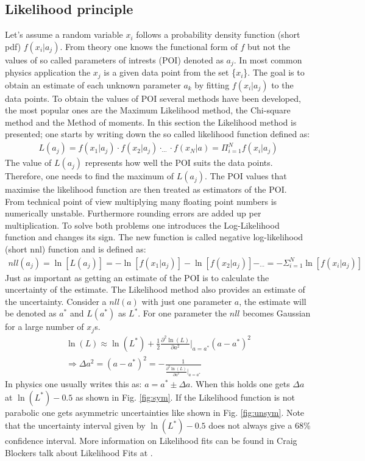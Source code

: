 \documentclass[english]{uzhpub}
\begin{document}
\subsection{Likelihood principle} \label{sec:Likelihood}
Let's assume a random variable $x_i$ follows a probability density function (short pdf) $f(x_i|a_j)$. From theory one knows the functional form of $f$ but not the values of so called parameters of intrests (POI) denoted as $a_j$. In most common physics application the $x_j$ is a given data point from the set \{$x_i$\}. The goal is to obtain an estimate of each unknown parameter $a_k$ by fitting $f(x_i|a_j)$ to the data points.
To obtain the values of POI several methods have been developed, the most popular ones are the Maximum Likelihood method, the Chi-square method and the Method of moments. In this section the Likelihood method is presented; one starts by writing down the so called likelihood function defined as:
\begin{align}
 L(a_j) = f(x_1|a_j) \cdot f(x_2|a_j) \cdot _{\cdots} \cdot f(x_N|a) = \Pi^{N}_{i = 1} f(x_i|a_j)
\end{align}
The value of $L(a_j)$ represents how well the POI suits the data points. Therefore, one needs to find the maximum of $L(a_j)$. The POI values that maximise the likelihood function are then treated as estimators of the POI. \\
From technical point of view multiplying many floating point numbers is numerically unstable. Furthermore rounding errors are added up per multiplication.
To solve both problems one introduces the Log-Likelihood function and changes its sign. The new function is called negative log-likelihood (short nnl) function and is defined as:
\begin{align}
 nll(a_j) = \ln[L(a_j)] = -\ln[f(x_1|a_j)] - \ln[f(x_2|a_j)] - _{\cdots} = - \Sigma^N_{i=1} \ln[f(x_i|a_j)]
\end{align}
Just as important as getting an estimate of the POI is to calculate the uncertainty of the estimate. The Likelihood method also provides an estimate of the uncertainty. Consider a $nll(a)$ with just one parameter $a$, the estimate will be denoted as $a^*$ and $L(a^*)$ as $L^*$. For one parameter the $nll$ becomes Gaussian for a large number of $x_j$s.
\begin{align}
 \ln(L) \approx \ln(L^*) + \frac{1}{2} \frac{\partial^2 \ln(L)}{\partial a^2}|_{a = a^*} \left(a - a^* \right)^2    \\
 \Rightarrow \Delta a^2 = \left(a - a^* \right)^2 = - \frac{1}{ \frac{\partial^2 \ln(L)}{\partial a^2}|_{a = a^*} }
\end{align}
In physics one usually writes this as: $a = a^* \pm \Delta a$. When this holds one gets $\Delta a$ at $\ln(L^*) - 0.5$ as shown in Fig. \ref{fig:sym}. If the Likelihood function is not parabolic one gets asymmetric uncertainties like shown in Fig. \ref{fig:unsym}. Note that the uncertainty interval given by $\ln(L^*) - 0.5$ does not always give a 68\% confidence interval. More information on Likelihood fits can be found in Craig Blockers talk about Likelihood Fits at \cite{bib:Likelihood}.
\end{document}
